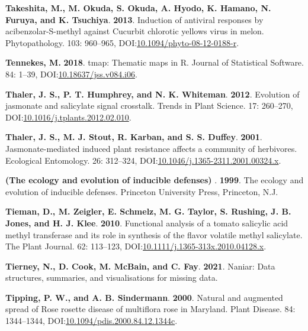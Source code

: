 \documentclass[12pt,final,CPage]{ufthesis}
\newlength{\cslhangindent}
\newenvironment{CSLReferences}[2] %
{%
	\setlength{\parindent}{0pt}
	\ifodd #1 \everypar{\setlength{\hangindent}{\cslhangindent}}\ignorespaces\fi
	\ifnum #2 > 0
	\setlength{\parskip}{#2\baselineskip}
	\fi
}%
{}
\begin{document}
{\begin{CSLReferences}{1}{0}
  \leavevmode{}%
  \textbf{Takeshita, M., M. Okuda, S. Okuda, A. Hyodo, K. Hamano, N. Furuya, and K. Tsuchiya}. \textbf{2013}. Induction of antiviral responses by acibenzolar-{S}-methyl against {Cucurbit chlorotic yellows virus} in melon. Phytopathology{\textregistered}. 103: 960--965, DOI:\href{https://doi.org/10.1094/phyto-08-12-0188-r}{10.1094/phyto-08-12-0188-r}.

  \leavevmode{}%
  \textbf{Tennekes, M.} \textbf{2018}. {tmap}: Thematic maps in {R}. Journal of Statistical Software. 84: 1--39, DOI:\href{https://doi.org/10.18637/jss.v084.i06}{10.18637/jss.v084.i06}.

  \leavevmode{}%
  \textbf{Thaler, J. S., P. T. Humphrey, and N. K. Whiteman}. \textbf{2012}. Evolution of jasmonate and salicylate signal crosstalk. Trends in Plant Science. 17: 260--270, DOI:\href{https://doi.org/10.1016/j.tplants.2012.02.010}{10.1016/j.tplants.2012.02.010}.

  \leavevmode{}%
  \textbf{Thaler, J. S., M. J. Stout, R. Karban, and S. S. Duffey}. \textbf{2001}. Jasmonate-mediated induced plant resistance affects a community of herbivores. Ecological Entomology. 26: 312--324, DOI:\href{https://doi.org/10.1046/j.1365-2311.2001.00324.x}{10.1046/j.1365-2311.2001.00324.x}.

  \leavevmode{}%
  \textbf{(The ecology and evolution of inducible defenses) }. \textbf{1999}. The ecology and evolution of inducible defenses. Princeton University Press, Princeton, N.J.

  \leavevmode{}%
  \textbf{Tieman, D., M. Zeigler, E. Schmelz, M. G. Taylor, S. Rushing, J. B. Jones, and H. J. Klee}. \textbf{2010}. Functional analysis of a tomato salicylic acid methyl transferase and its role in synthesis of the flavor volatile methyl salicylate. The Plant Journal. 62: 113--123, DOI:\href{https://doi.org/10.1111/j.1365-313x.2010.04128.x}{10.1111/j.1365-313x.2010.04128.x}.

  \leavevmode{}%
  \textbf{Tierney, N., D. Cook, M. McBain, and C. Fay}. \textbf{2021}. Naniar: Data structures, summaries, and visualisations for missing data.

  \leavevmode{}%
  \textbf{Tipping, P. W., and A. B. Sindermann}. \textbf{2000}. Natural and augmented spread of {Rose rosette disease} of multiflora rose in {Maryland}. Plant Disease. 84: 1344--1344, DOI:\href{https://doi.org/10.1094/pdis.2000.84.12.1344c}{10.1094/pdis.2000.84.12.1344c}.


\end{CSLReferences}}
\end{document}
